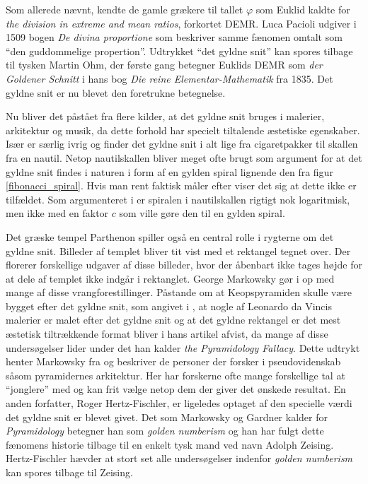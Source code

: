 {
Som allerede nævnt, kendte de gamle grækere til tallet $\varphi$ som
Euklid kaldte for \emph{the division in extreme and mean ratios},
forkortet DEMR. Luca Pacioli udgiver i 1509 bogen \emph{De divina
proportione} som beskriver samme fænomen omtalt som ``den guddommelige
propertion''. Udtrykket ``det gyldne snit'' kan spores tilbage til
tysken Martin Ohm, der første gang betegner Euklids DEMR som \emph{der
Goldener Schnitt} i hans bog \emph{Die reine Elementar-Mathematik} fra
1835\cite{Markowsky1992}. Det gyldne snit er nu blevet den foretrukne
betegnelse.

Nu bliver det påstået fra flere kilder, at det gyldne snit bruges i
malerier, arkitektur og musik, da dette forhold har specielt tiltalende
æstetiske
egenskaber\cite{GoldenNumber}\cite{RatioArt}\cite{Putz1995}\cite{Stakhov2006490}\cite{Boussora2004}.
Især \cite{GoldenNumber} er særlig ivrig og finder det gyldne snit i alt
lige fra cigaretpakker til skallen fra en nautil. Netop nautilskallen
bliver meget ofte brugt som argument for at det gyldne snit findes i
naturen i form af en gylden spiral lignende den fra figur
\ref{fibonacci_spiral}. Hvis man rent faktisk måler efter
viser det sig at dette ikke er tilfældet. Som argumenteret i
\cite{Sharp2002} er spiralen i nautilskallen rigtigt nok logaritmisk,
men ikke med en faktor $c$ som ville gøre den til en gylden spiral.

Det græske tempel Parthenon spiller også en central rolle i rygterne om
det gyldne snit. Billeder af templet bliver tit vist med et rektangel
tegnet over. Der florerer forskellige udgaver af disse billeder, hvor
der åbenbart ikke tages højde for at dele af templet ikke indgår i
rektanglet. George Markowsky gør i \cite{Markowsky1992} op med mange af
disse vrangforestillinger. Påstande om at Keopspyramiden skulle være
bygget efter det gyldne snit, som angivet i \cite{Stakhov2006490}, at
nogle af Leonardo da Vincis malerier er malet efter det gyldne snit og
at det gyldne rektangel er det mest æstetisk tiltrækkende
format\cite{GoldenNumber}\cite{RatioArt} bliver i hans artikel afvist,
da mange af disse undersøgelser lider under det han kalder \emph{the
Pyramidology Fallacy}. Dette udtrykt henter Markowsky fra
\cite{Gardner1952_2} og beskriver de personer der forsker i
pseudovidenskab såsom pyramidernes arkitektur. Her har forskerne ofte
mange forskellige tal at ``jonglere'' med og kan frit vælge netop dem
der giver det ønskede resultat. En anden forfatter, Roger
Hertz-Fischler, er ligeledes optaget af den specielle værdi det gyldne
snit er blevet givet. Det som Markowsky og Gardner kalder for
\emph{Pyramidology} betegner han som \emph{golden numberism} og han har
fulgt dette fænomens historie tilbage til en enkelt tysk mand ved navn
Adolph Zeising\cite{Herz-Fischler2005}. Hertz-Fischler hævder at stort
set alle undersøgelser indenfor \emph{golden numberism} kan spores
tilbage til Zeising.

}
